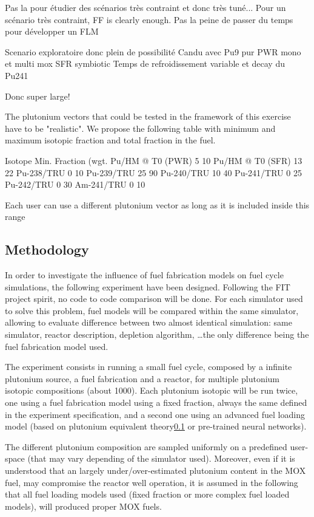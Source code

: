 Pas la pour étudier des scénarios très contraint et donc très tuné... Pour un scénario très contraint, FF is clearly enough. Pas la peine de passer du temps pour développer un FLM

Scenario exploratoire donc plein de possibilité
Candu avec Pu9 pur
PWR mono et multi mox
SFR symbiotic 
Temps de refroidissement variable et decay du Pu241

Donc super large!


The plutonium vectors that could be tested in the framework of this exercise have to be "realistic". We propose the following table with minimum and maximum isotopic fraction and total fraction in the fuel. 

Isotope Min. Fraction (wgt. %
Pu/HM @ T0 (PWR)    5   10
Pu/HM @ T0 (SFR)    13  22
Pu-238/TRU  0   10
Pu-239/TRU  25  90
Pu-240/TRU  10  40
Pu-241/TRU  0   25
Pu-242/TRU  0   30
Am-241/TRU  0   10

Each user can use a different plutonium vector as long as it is included inside this range


\subsection{Methodology}

In order to investigate the influence of fuel fabrication models on fuel cycle
simulations, the following experiment have been designed. Following the FIT
project spirit, no code to code comparison will be done. For each simulator used
to solve this problem, fuel models will be compared within the same simulator,
allowing to evaluate difference between two almost identical simulation: same
simulator, reactor description, depletion algorithm, \ldots the only difference
being the fuel fabrication model used.

The experiment consists in running a small fuel cycle, composed by a infinite
plutonium source, a fuel fabrication and a reactor, for multiple plutonium
isotopic compositions (about 1000). Each plutonium isotopic will be run twice,
one using a fuel fabrication model using a fixed fraction, always the same
defined in the experiment specification, and a second one using an advanced fuel
loading model (based on plutonium equivalent theory\ref{} or pre-trained neural
networks).

The different plutonium composition are sampled uniformly on a predefined
user-space (that may vary depending of the simulator used). Moreover, even if
it is understood that an largely under/over-estimated plutonium content in the
MOX fuel, may compromise the reactor well operation, it is assumed in the
following that all fuel loading models used (fixed fraction or more complex fuel
loaded models), will produced proper MOX fuels.

